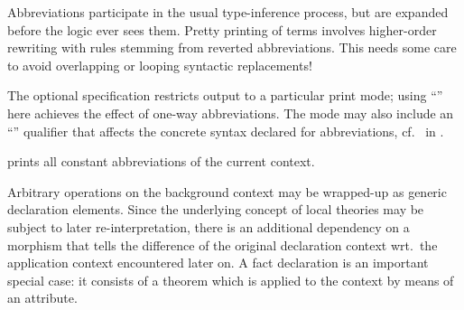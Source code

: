 \begin{isabellebody}
\begin{isamarkuptext}
\begin{description}
  Abbreviations participate in the usual type-inference process, but
  are expanded before the logic ever sees them.  Pretty printing of
  terms involves higher-order rewriting with rules stemming from
  reverted abbreviations.  This needs some care to avoid overlapping
  or looping syntactic replacements!
  
  The optional  specification restricts output to a
  particular print mode; using ``'' here achieves the
  effect of one-way abbreviations.  The mode may also include an
  ``\hyperlink{keyword.output}{\mbox{}}'' qualifier that affects the concrete syntax
  declared for abbreviations, cf.\ \hyperlink{command.syntax}{\mbox{}} in
  .
  
  \item \hyperlink{command.print-abbrevs}{\mbox{}} prints all constant abbreviations
  of the current context.
  
  \end{description}%
\end{isamarkuptext}%
\isamarkuptrue%
%
\isamarkuptrue%
%
\begin{isamarkuptext}%
Arbitrary operations on the background context may be wrapped-up as
  generic declaration elements.  Since the underlying concept of local
  theories may be subject to later re-interpretation, there is an
  additional dependency on a morphism that tells the difference of the
  original declaration context wrt.\ the application context
  encountered later on.  A fact declaration is an important special
  case: it consists of a theorem which is applied to the context by
  means of an attribute.


\end{isamarkuptext}
\end{isabellebody}
